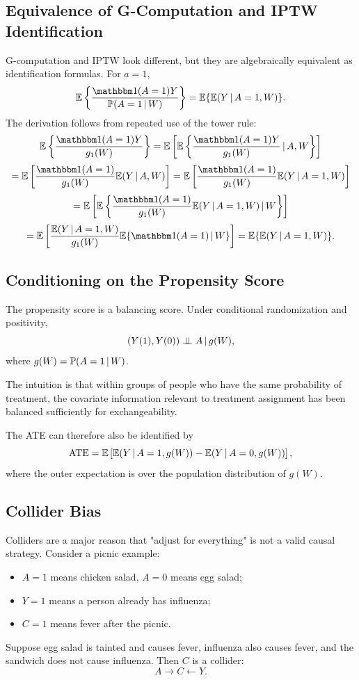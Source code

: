 \label{lec:3-9}

\subsection{Equivalence of G-Computation and IPTW Identification}

G-computation and IPTW look different, but they are algebraically equivalent as identification formulas. For $a=1$,
\[
\E\left\{\frac{\ind(A=1)Y}{\Prob(A=1\given W)}\right\}
=
\E\{\E(Y\given A=1,W)\}.
\]
The derivation follows from repeated use of the tower rule:
\[
\E\left\{\frac{\ind(A=1)Y}{g_1(W)}\right\}
=
\E\left[
\E\left\{
\frac{\ind(A=1)Y}{g_1(W)}
\given A,W
\right\}
\right]
\]
\[
=
\E\left[
\frac{\ind(A=1)}{g_1(W)}
\E(Y\given A,W)
\right]
=
\E\left[
\frac{\ind(A=1)}{g_1(W)}
\E(Y\given A=1,W)
\right]
\]
\[
=
\E\left[
\E\left\{
\frac{\ind(A=1)}{g_1(W)}
\E(Y\given A=1,W)
\given W
\right\}
\right]
\]
\[
=
\E\left[
\frac{\E(Y\given A=1,W)}{g_1(W)}
\E\{\ind(A=1)\given W\}
\right]
=
\E\{\E(Y\given A=1,W)\}.
\]

\subsection{Conditioning on the Propensity Score}

The propensity score is a balancing score. Under conditional randomization and positivity,
\[
(Y(1),Y(0))\perp\!\!\!\perp A\,\vert\, g(W),
\]
where $g(W)=\mathbb{P}(A=1\,\vert\, W)$.

The intuition is that within groups of people who have the same probability of treatment, the covariate information relevant to treatment assignment has been balanced sufficiently for exchangeability.

The ATE can therefore also be identified by
\[
\operatorname{ATE}
=
\mathbb{E}\left[
\mathbb{E}(Y\,\vert\, A=1,g(W))
-
\mathbb{E}(Y\,\vert\, A=0,g(W))
\right],
\]
where the outer expectation is over the population distribution of $g(W)$.

\subsection{Collider Bias}

Colliders are a major reason that "adjust for everything" is not a valid causal strategy. Consider a picnic example:
\begin{itemize}
  \item $A=1$ means chicken salad, $A=0$ means egg salad;
  \item $Y=1$ means a person already has influenza;
  \item $C=1$ means fever after the picnic.
\end{itemize}
Suppose egg salad is tainted and causes fever, influenza also causes fever, and the sandwich does not cause influenza. Then $C$ is a collider:
\[
A\to C\leftarrow Y.
\]

